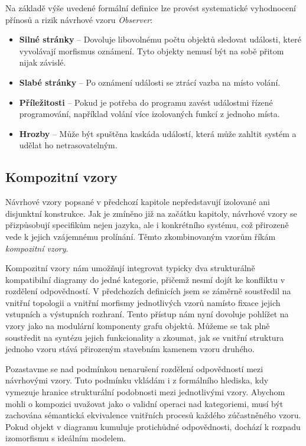\documentclass[FM,DP,fonts]{tulthesis}
\begin{document}
Na základě výše uvedené formální definice lze provést systematické vyhodnocení přínosů a rizik návrhové vzoru \textit{Observer}:
\begin{itemize}
	\item \textbf{Silné stránky} – Dovoluje libovolnému počtu objektů sledovat události, které vyvolávají morfismus oznámení. Tyto objekty nemusí být na sobě přitom nijak závislé.
	\item \textbf{Slabé stránky} – Po oznámení události se ztrácí vazba na místo volání.
	\item \textbf{Příležitosti} – Pokud je potřeba do programu zavést událostmi řízené programování, například volání více izolovaných funkcí z jednoho místa.
	\item \textbf{Hrozby} – Může být spuštěna kaskáda událostí, která může zahltit systém a udělat ho netrasovatelným.
\end{itemize}

\subsection{Kompozitní vzory}
Návrhové vzory popsané v předchozí kapitole nepředstavují izolované ani disjunktní konstrukce. Jak je zmíněno již na začátku kapitoly, návrhové vzory se přizpůsobují specifikům nejen jazyka, ale i konkrétního systému, což přirozeně vede k jejich vzájemnému prolínání. Těmto zkombinovaným vzorům říkám \textit{kompozitní vzory}.

Kompozitní vzory nám umožňují integrovat typicky dva strukturálně kompatibilní diagramy do jedné kategorie, přičemž nesmí dojít ke konfliktu v rozdělení odpovědností. V předchozích definicích jsem se záměrně soustředil na vnitřní topologii a vnitřní morfismy jednotlivých vzorů namísto fixace jejich vstupních a výstupních rozhraní. Tento přístup nám nyní dovoluje pohlížet na vzory jako na modulární komponenty grafu objektů. Můžeme se tak plně soustředit na syntézu jejich funkcionality a zkoumat, jak se vnitřní struktura jednoho vzoru stává přirozeným stavebním kamenem vzoru druhého.

Pozastavme se nad podmínkou nenarušení rozdělení odpovědností mezi návrhovými vzory. Tuto podmínku vkládám i z formálního hlediska, kdy vymezuje hranice strukturální podobnosti mezi jednotlivými vzory. Abychom mohli o kompozici uvažovat jako o validní operaci nad kategoriemi, musí být zachována sémantická ekvivalence vnitřních procesů každého zúčastněného vzoru. Pokud objekt v diagramu kumuluje protichůdné odpovědnosti, dochází k rozpadu izomorfismu s ideálním modelem.
\end{document}
